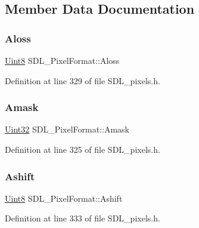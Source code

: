 \subsection{Member Data Documentation}
\mbox{\label{struct_s_d_l___pixel_format_a660e95097874088292f1289a458efaa2}} 
\subsubsection{\texorpdfstring{Aloss}{Aloss}}
{\footnotesize\ttfamily \mbox{\hyperlink{_s_d_l__stdinc_8h_a2944638813a090aa23e62f4da842c3e2}{Uint8}} S\+D\+L\+\_\+\+Pixel\+Format\+::\+Aloss}



Definition at line 329 of file S\+D\+L\+\_\+pixels.\+h.

\mbox{\label{struct_s_d_l___pixel_format_a6cdaf31f6cb153fefda47fa6b8368c0e}} 
\subsubsection{\texorpdfstring{Amask}{Amask}}
{\footnotesize\ttfamily \mbox{\hyperlink{_s_d_l__stdinc_8h_add440eff171ea5f55cb00c4a9ab8672d}{Uint32}} S\+D\+L\+\_\+\+Pixel\+Format\+::\+Amask}



Definition at line 325 of file S\+D\+L\+\_\+pixels.\+h.

\mbox{\label{struct_s_d_l___pixel_format_ac3c4ffa0de1f2c94040340deede3bf46}} 
\subsubsection{\texorpdfstring{Ashift}{Ashift}}
{\footnotesize\ttfamily \mbox{\hyperlink{_s_d_l__stdinc_8h_a2944638813a090aa23e62f4da842c3e2}{Uint8}} S\+D\+L\+\_\+\+Pixel\+Format\+::\+Ashift}



Definition at line 333 of file S\+D\+L\+\_\+pixels.\+h.

